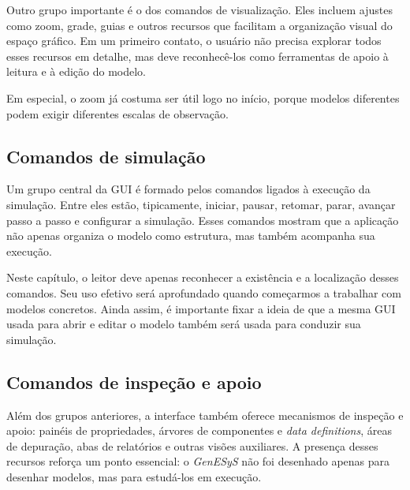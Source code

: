 Outro grupo importante é o dos comandos de visualização. Eles incluem ajustes como zoom, grade, guias e outros recursos que facilitam a organização visual do espaço gráfico. Em um primeiro contato, o usuário não precisa explorar todos esses recursos em detalhe, mas deve reconhecê-los como ferramentas de apoio à leitura e à edição do modelo.

Em especial, o zoom já costuma ser útil logo no início, porque modelos diferentes podem exigir diferentes escalas de observação.

\subsection{Comandos de simulação}
\label{subsec:cap3_comandos_simulacao}

Um grupo central da GUI é formado pelos comandos ligados à execução da simulação. Entre eles estão, tipicamente, iniciar, pausar, retomar, parar, avançar passo a passo e configurar a simulação. Esses comandos mostram que a aplicação não apenas organiza o modelo como estrutura, mas também acompanha sua execução.

Neste capítulo, o leitor deve apenas reconhecer a existência e a localização desses comandos. Seu uso efetivo será aprofundado quando começarmos a trabalhar com modelos concretos. Ainda assim, é importante fixar a ideia de que a mesma GUI usada para abrir e editar o modelo também será usada para conduzir sua simulação.

\subsection{Comandos de inspeção e apoio}
\label{subsec:cap3_comandos_inspecao_apoio}

Além dos grupos anteriores, a interface também oferece mecanismos de inspeção e apoio: painéis de propriedades, árvores de componentes e \textit{data definitions}, áreas de depuração, abas de relatórios e outras visões auxiliares. A presença desses recursos reforça um ponto essencial: o \textit{GenESyS} não foi desenhado apenas para desenhar modelos, mas para estudá-los em execução.

